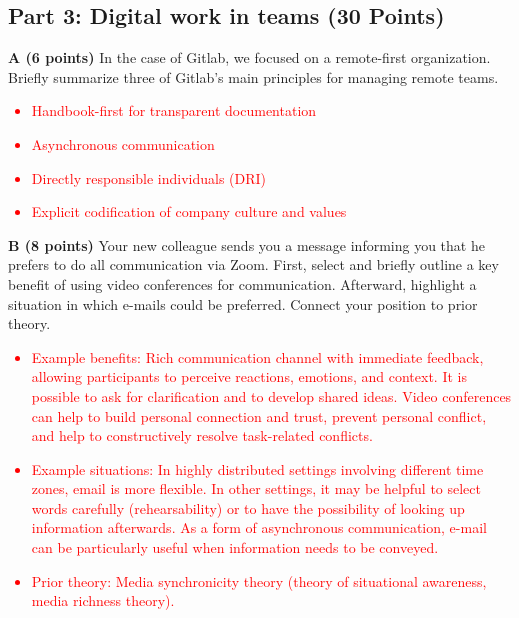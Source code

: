 \documentclass[12pt]{scrartcl}
\begin{document}
\vspace{0.3cm}

\subsection*{Part 3: Digital work in teams (30 Points)}

\textbf{A (6 points)} In the case of Gitlab, we focused on a remote-first organization. Briefly summarize three of Gitlab's main principles for managing remote teams.

\textcolor{red}{
	\begin{itemize}
		\item Handbook-first for transparent documentation
		\item Asynchronous communication
		\item Directly responsible individuals (DRI)
		\item Explicit codification of company culture and values
	\end{itemize}
}

\newpage

\textbf{B (8 points)} Your new colleague sends you a message informing you that he prefers to do all communication via Zoom. First, select and briefly outline a key benefit of using video conferences for communication. Afterward, highlight a situation in which e-mails could be preferred. Connect your position to prior theory.

\textcolor{red}{
	\begin{itemize}
		\item Example benefits: Rich communication channel with immediate feedback, allowing participants to perceive reactions, emotions, and context. It is possible to ask for clarification and to develop shared ideas. Video conferences can help to build personal connection and trust, prevent personal conflict, and help to constructively resolve task-related conflicts.
		\item Example situations: In highly distributed settings involving different time zones, email is more flexible. In other settings, it may be helpful to select words carefully (rehearsability) or to have the possibility of looking up information afterwards. As a form of asynchronous communication, e-mail can be particularly useful when information needs to be conveyed.
		\item Prior theory: Media synchronicity theory (theory of situational awareness, media richness theory).
	\end{itemize}
}
\end{document}
